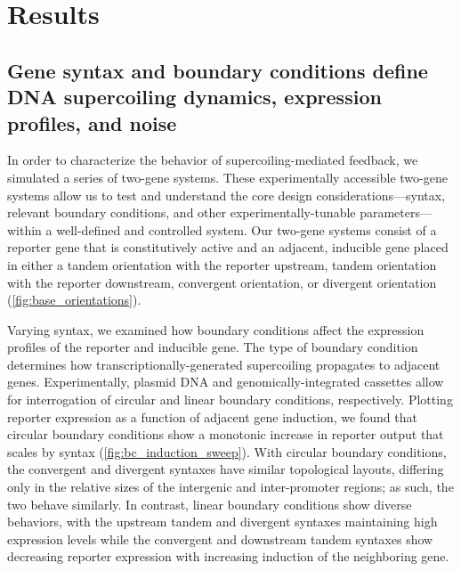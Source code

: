 \documentclass[11pt]{article}
\begin{document}
\FloatBarrier
\section{Results}

\subsection{Gene syntax and boundary conditions define DNA supercoiling dynamics, expression profiles, and noise}
In order to characterize the behavior of supercoiling-mediated feedback, we simulated a series of two-gene systems. These experimentally accessible two-gene systems allow us to test and understand the core design considerations---syntax, relevant boundary conditions, and other experimentally-tunable parameters---within a well-defined and controlled system. Our two-gene systems consist of a reporter gene that is constitutively active and an adjacent, inducible gene placed in either a tandem orientation with the reporter upstream, tandem orientation with the reporter downstream, convergent orientation, or divergent orientation (\cref{fig:base_orientations}).

Varying syntax, we examined how boundary conditions affect the expression profiles of the reporter and inducible gene. The type of boundary condition determines how transcriptionally-generated supercoiling propagates to adjacent genes. Experimentally, plasmid DNA and genomically-integrated cassettes allow for interrogation of circular and linear boundary conditions, respectively.  Plotting reporter expression as a function of adjacent gene induction, we found that circular boundary conditions show a monotonic increase in reporter output that scales by syntax (\cref{fig:bc_induction_sweep}). With circular boundary conditions, the convergent and divergent syntaxes have similar topological layouts, differing only in the relative sizes of the intergenic and inter-promoter regions; as such, the two behave similarly. In contrast, linear boundary conditions show diverse behaviors, with the upstream tandem and divergent syntaxes maintaining high expression levels while the convergent and downstream tandem syntaxes show decreasing reporter expression with increasing induction of the neighboring gene.
\end{document}
